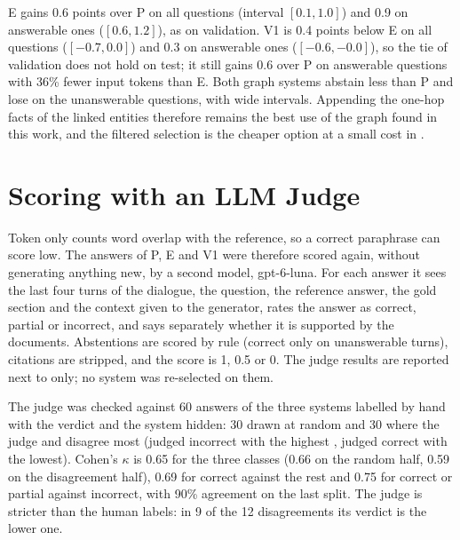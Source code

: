 E gains 0.6 points over P on all questions (interval $[0.1, 1.0]$) and 0.9 on answerable
ones ($[0.6, 1.2]$), as on validation. V1 is 0.4 points below E on all questions
($[-0.7, 0.0]$) and 0.3 on answerable ones ($[-0.6, -0.0]$), so the tie of validation does not
hold on test; it still gains 0.6 over P on answerable questions with 36\% fewer input tokens
than E. Both graph systems abstain less than P and lose on the unanswerable questions, with
wide intervals. Appending the one-hop facts of the linked entities therefore remains the best
use of the graph found in this work, and the filtered selection is the cheaper option at a
small cost in \fone{}.


\section{Scoring with an LLM Judge}\label{sec:graphrag:judge}

Token \fone{} only counts word overlap with the reference, so a correct paraphrase can score
low. The answers of P, E and V1 were therefore scored again, without generating anything new,
by a second model, gpt-6-luna. For each answer it sees the last four turns of the dialogue,
the question, the reference answer, the gold section and the context given to the generator,
rates the answer as correct, partial or incorrect, and says separately whether it is supported
by the documents. Abstentions are scored by rule (correct only on unanswerable turns), citations
are stripped, and the score is 1, 0.5 or 0. The judge results are reported next to \fone{} only;
no system was re-selected on them.

The judge was checked against 60 answers of the three systems labelled by hand with the verdict
and the system hidden: 30 drawn at random and 30 where the judge and \fone{} disagree most
(judged incorrect with the highest \fone{}, judged correct with the lowest). Cohen's $\kappa$ is
0.65 for the three classes (0.66 on the random half, 0.59 on the disagreement half), 0.69 for
correct against the rest and 0.75 for correct or partial against incorrect, with 90\%
agreement on the last split. The judge is stricter than the human labels: in 9 of the 12
disagreements its verdict is the lower one.


